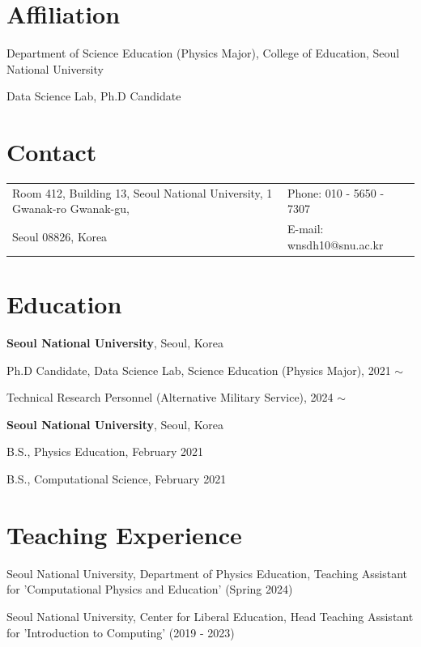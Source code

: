 \documentclass[margin,line]{res}
\newenvironment{list1}{
  \begin{list}{\ding{113}}{%
      \setlength{\itemsep}{0in}
      \setlength{\parsep}{0in} \setlength{\parskip}{0in}
      \setlength{\topsep}{0in} \setlength{\partopsep}{0in} 
      \setlength{\leftmargin}{0.17in}}}{\end{list}}
\begin{document}
\begin{resume}
\section{Affiliation}
Department of Science Education (Physics Major), College of Education, Seoul National University

Data Science Lab, Ph.D Candidate

\section{\sc Contact}
\vspace{.05in}
\begin{tabular}{@{}p{3in}p{4in}}
Room 412, Building 13, Seoul National University, 1 Gwanak-ro Gwanak-gu,    & {Phone:}  010 - 5650 - 7307 \\                   
Seoul 08826, Korea & {E-mail:}  wnsdh10@snu.ac.kr\\         
\end{tabular}

\section{\sc Education}

{\bf Seoul National University}, Seoul, Korea\\
\vspace*{-.1in}
\begin{list1}
\item[] Ph.D Candidate, Data Science Lab, Science Education (Physics Major), 2021 $\sim$
\item[] Technical Research Personnel (Alternative Military Service), 2024 $\sim$
\end{list1}
{\bf Seoul National University}, Seoul, Korea\\
\vspace*{-.1in}
\begin{list1}
\item[] B.S., Physics Education,  February 2021
\item[] B.S., Computational Science,  February 2021
\end{list1}


\section{\sc Teaching Experience}
\begin{list1}
    \item[] Seoul National University, Department of Physics Education, Teaching Assistant for 'Computational Physics and Education' (Spring 2024)
    \item[] Seoul National University, Center for Liberal Education, Head Teaching Assistant for 'Introduction to Computing' (2019 - 2023)
\end{list1}



\end{resume}
\end{document}
